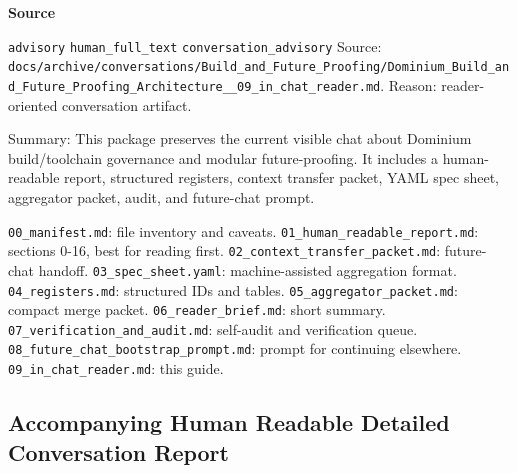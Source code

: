 \documentclass[9pt,a4paper,openany]{book}
\newcommand{\vonecallout}[3]{\par\medskip\noindent\begingroup\setlength{\fboxsep}{7pt}\colorbox{DomCalloutBg}{\parbox{0.94\linewidth}{\textbf{\textcolor{#1}{#2}}\par #3}}\endgroup\par\medskip}
\begin{document}
\vonecallout{DomSlate}{Source}{\texttt{advisory} \texttt{human\_\allowbreak{}full\_\allowbreak{}text} \texttt{conversation\_\allowbreak{}advisory} Source: \texttt{docs/\allowbreak{}archive/\allowbreak{}conversations/\allowbreak{}Build\_\allowbreak{}and\_\allowbreak{}Future\_\allowbreak{}Proofing/\allowbreak{}Dominium\_\allowbreak{}Build\_\allowbreak{}and\_\allowbreak{}Future\_\allowbreak{}Proofing\_\allowbreak{}Architecture\_\allowbreak{}\_\allowbreak{}09\_\allowbreak{}in\_\allowbreak{}chat\_\allowbreak{}reader.\allowbreak{}md}.\allowbreak{} Reason: reader-\allowbreak{}oriented conversation artifact.\allowbreak{}}

Summary: This package preserves the current visible chat about Dominium build/\allowbreak{}toolchain governance and modular future-\allowbreak{}proofing.\allowbreak{} It includes a human-\allowbreak{}readable report, structured registers, context transfer packet, YAML spec sheet, aggregator packet, audit, and future-\allowbreak{}chat prompt.\allowbreak{}


\texttt{00\_\allowbreak{}manifest.\allowbreak{}md}: file inventory and caveats.\allowbreak{} \texttt{01\_\allowbreak{}human\_\allowbreak{}readable\_\allowbreak{}report.\allowbreak{}md}: sections 0-\allowbreak{}16, best for reading first.\allowbreak{} \texttt{02\_\allowbreak{}context\_\allowbreak{}transfer\_\allowbreak{}packet.\allowbreak{}md}: future-\allowbreak{}chat handoff.\allowbreak{} \texttt{03\_\allowbreak{}spec\_\allowbreak{}sheet.\allowbreak{}yaml}: machine-\allowbreak{}assisted aggregation format.\allowbreak{} \texttt{04\_\allowbreak{}registers.\allowbreak{}md}: structured IDs and tables.\allowbreak{} \texttt{05\_\allowbreak{}aggregator\_\allowbreak{}packet.\allowbreak{}md}: compact merge packet.\allowbreak{} \texttt{06\_\allowbreak{}reader\_\allowbreak{}brief.\allowbreak{}md}: short summary.\allowbreak{} \texttt{07\_\allowbreak{}verification\_\allowbreak{}and\_\allowbreak{}audit.\allowbreak{}md}: self-\allowbreak{}audit and verification queue.\allowbreak{} \texttt{08\_\allowbreak{}future\_\allowbreak{}chat\_\allowbreak{}bootstrap\_\allowbreak{}prompt.\allowbreak{}md}: prompt for continuing elsewhere.\allowbreak{} \texttt{09\_\allowbreak{}in\_\allowbreak{}chat\_\allowbreak{}reader.\allowbreak{}md}: this guide.\allowbreak{}



\subsection{Accompanying Human Readable Detailed Conversation Report}
\end{document}
